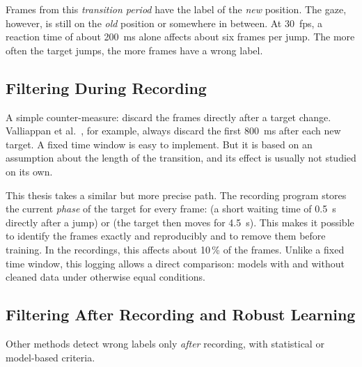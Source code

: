 Frames from this \emph{transition period} have the label of the \emph{new}
position. The gaze,
however, is still on the \emph{old} position or somewhere in between. At
\SI{30}{fps}, a reaction time of about \SI{200}{\milli\second} alone affects
about six frames per jump. The more often the target jumps, the more frames
have a wrong label.

\subsection{Filtering During Recording}
\label{subsec:phase_logging}
A simple counter-measure: discard the frames directly after a target change.
Valliappan et al.~\cite{valliappan2020smartphone}, for example, always discard
the first \SI{800}{\milli\second} after each new target. A fixed time window is
easy to implement. But it is based on an assumption about the length of the
transition, and its effect is usually not studied on its own.

This thesis takes a similar but more precise path. The recording program stores
the current \emph{phase} of the target for every frame:  (a short
waiting time of \SI{0.5}{\second} directly after a jump) or  (the
target then moves for \SI{4.5}{\second}). This makes it possible to identify
the  frames exactly and reproducibly and to remove them before
training. In the recordings, this affects about 10\,\% of the frames. Unlike a
fixed time window, this logging allows a direct comparison: models with and
without cleaned data under otherwise equal conditions.

\subsection{Filtering After Recording and Robust Learning}
\label{subsec:dmrf}
Other methods detect wrong labels only \emph{after} recording, with statistical
or model-based criteria.

